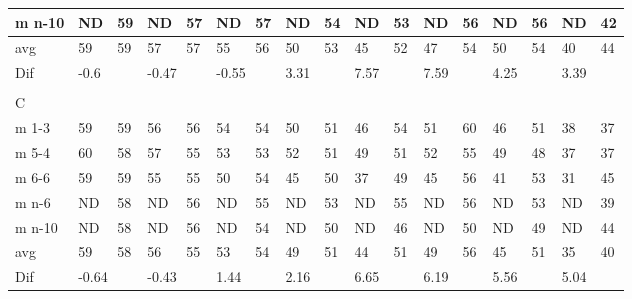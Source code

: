 \begin{table}[]
\begin{tabular}{l|l|l|l|l|l|l|l|l|l|l|l|l|l|l|ll}
m n-10  &   ND  &     59    &   ND    &   57    &     ND      &     57      &    ND     &     54       &       ND     &       53     &      ND      &       56     &        ND   &       56     & \multicolumn{1}{l|}{ND} & 42 \\ \hline
avg       &      59 &   59     &      57    &  57     &    55         &     56       &      50      &   53    &     45       &    52        &    47        &      54      &      50      &     54       & \multicolumn{1}{l|}{40} &44 \\ \hline
Dif & \multicolumn{2}{l|}{-0.6} & \multicolumn{2}{l|}{-0.47} & \multicolumn{2}{l|}{-0.55} & \multicolumn{2}{l|}{3.31} & \multicolumn{2}{l|}{7.57} & \multicolumn{2}{l|}{7.59}& \multicolumn{2}{l|}{4.25}& \multicolumn{2}{l}{3.39} \\
\multicolumn{17}{l}{ } \\   
C & \multicolumn{2}{l|}{} & \multicolumn{2}{l|}{} & \multicolumn{2}{l|}{} & \multicolumn{2}{l|}{} & \multicolumn{2}{l|}{} & \multicolumn{2}{l|}{}& \multicolumn{2}{l|}{}& \multicolumn{2}{l}{}     \\ \hline
m 1-3   &   59  &      59      &    56  &   56         &   54   &     54       &  50   &      51      &  46   &  54   &  51   &      60      &   46   &      51      & \multicolumn{1}{l|}{38} &37  \\
m 5-4   &    60  &      58      &   57  &     55       &   53    &     53       &  52  &      51      &  49  &  51   &   52  &        55    &   49  &      48      & \multicolumn{1}{l|}{37} &37  \\
m 6-6   &    59   &     59       &  55  &     55       &    50   &      54      &  45   &       50     &   37  & 49   &   45   &      56      &   41 &       53     & \multicolumn{1}{l|}{31} & 45 \\
m n-6   &   ND    &     58       &  ND  &    56        & ND   &      55      &  ND   &      53      & ND & 55   &   ND   &      56      &   ND   &    53        & \multicolumn{1}{l|}{ND} & 39 \\
m n-10  &  ND   &      58      &   ND  &    56        &  ND  &      54      &   ND  &       50    &  ND  &  46 &  ND    &     50       &   ND   &      49      & \multicolumn{1}{l|}{ND} &  44\\ \hline
avg      &   59    &      58      &     56   &     55      &      53&   54      &       49  &     51       &   44   &  51     &  49     &   56         &      45      &    51        & \multicolumn{1}{l|}{35} &40 \\ \hline
Dif & \multicolumn{2}{l|}{-0.64} & \multicolumn{2}{l|}{-0.43} & \multicolumn{2}{l|}{1.44} & \multicolumn{2}{l|}{2.16} & \multicolumn{2}{l|}{6.65} & \multicolumn{2}{l|}{6.19}& \multicolumn{2}{l|}{5.56}& \multicolumn{2}{l}{5.04} \\

\end{tabular}
\end{table}
